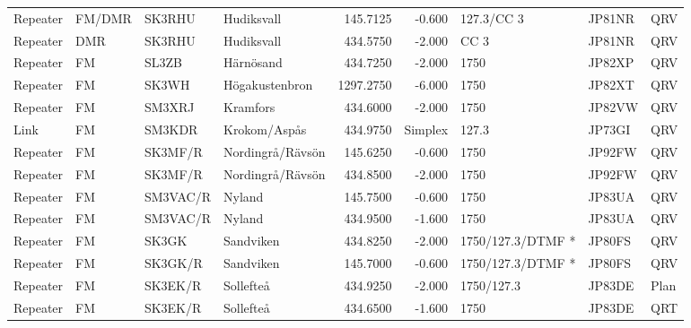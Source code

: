 {\begin{landscape}
\begin{longtable}{llllrrlll}
	Repeater          & FM/DMR          & SK3RHU   & Hudiksvall          &     145.7125 &     -0.600 & 127.3/CC 3         & JP81NR      & QRV      \\
	Repeater          & DMR             & SK3RHU   & Hudiksvall          &     434.5750 &     -2.000 & CC 3               & JP81NR      & QRV      \\
	Repeater          & FM              & SL3ZB    & Härnösand           &     434.7250 &     -2.000 & 1750               & JP82XP      & QRV      \\
	Repeater          & FM              & SK3WH    & Högakustenbron      &    1297.2750 &     -6.000 & 1750               & JP82XT      & QRV      \\
	Repeater          & FM              & SM3XRJ   & Kramfors            &     434.6000 &     -2.000 & 1750               & JP82VW      & QRV      \\
	Link              & FM              & SM3KDR   & Krokom/Aspås        &     434.9750 &    Simplex & 127.3              & JP73GI      & QRV      \\
	Repeater          & FM              & SK3MF/R  & Nordingrå/Rävsön    &     145.6250 &     -0.600 & 1750               & JP92FW      & QRV      \\
	Repeater          & FM              & SK3MF/R  & Nordingrå/Rävsön    &     434.8500 &     -2.000 & 1750               & JP92FW      & QRV      \\
	Repeater          & FM              & SM3VAC/R & Nyland              &     145.7500 &     -0.600 & 1750               & JP83UA      & QRV      \\
	Repeater          & FM              & SM3VAC/R & Nyland              &     434.9500 &     -1.600 & 1750               & JP83UA      & QRV      \\
	Repeater          & FM              & SK3GK    & Sandviken           &     434.8250 &     -2.000 & 1750/127.3/DTMF *  & JP80FS      & QRV      \\
	Repeater          & FM              & SK3GK/R  & Sandviken           &     145.7000 &     -0.600 & 1750/127.3/DTMF *  & JP80FS      & QRV      \\
	Repeater          & FM              & SK3EK/R  & Sollefteå           &     434.9250 &     -2.000 & 1750/127.3         & JP83DE      & Plan     \\
	Repeater          & FM              & SK3EK/R  & Sollefteå           &     434.6500 &     -1.600 & 1750               & JP83DE      & QRT      \\

\end{longtable}
\end{landscape}}
